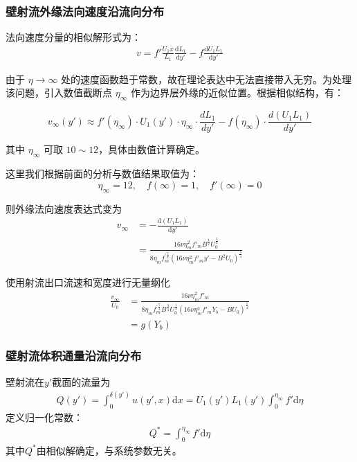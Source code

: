 \subsubsection{壁射流外缘法向速度沿流向分布}
法向速度分量的相似解形式为：
\begin{align*}
    v=f'\frac{U_{1}x}{L_{1}}\frac{\mathrm{d}L_{1}}{\mathrm{d}y'}-f\frac{\mathrm{d}U_{1}L_{1}}{\mathrm{d}y'}
\end{align*}

由于 $\eta \to \infty$ 处的速度函数趋于常数，故在理论表达中无法直接带入无穷。为处理该问题，引入数值截断点 $\eta_\infty$ 作为边界层外缘的近似位置。根据相似结构，有：

\[
v_{\infty}(y') \approx f'(\eta_\infty) \cdot U_1(y') \cdot \eta_\infty \cdot \frac{dL_1}{dy'} - f(\eta_\infty) \cdot \frac{d(U_1 L_1)}{dy'}
\]

其中 $\eta_\infty$ 可取 $10\sim12$，具体由数值计算确定。

这里我们根据前面的分析与数值结果取值为：
\[
\eta_{\infty}=12, \quad f(\infty)=1, \quad f'(\infty)=0
\]

则外缘法向速度表达式变为
\begin{align*}
    v_{\infty}&=-\frac{\mathrm{d}(U_{1}L_{1})}{\mathrm{d}y'}\\
    &=\frac{16\nu\eta_{m}^{2}f'_{m}B^{\frac{1}{2}}U_{0}^{\frac{3}{4}}}{8\eta_{m}f_{m}^{'\frac{7}{4}}(16\nu\eta_{m}^{2}f'_{m}y'-B^{2}U_{0})^{\frac{5}{4}}}
\end{align*}

使用射流出口流速和宽度进行无量纲化
\begin{align}
    \frac{v_{\infty}}{U_{0}}&=\frac{16\nu\eta_{m}^{2}f'_{m}}{8\eta_{m}f_{m}^{'\frac{7}{4}}B^{\frac{3}{4}}U_{0}^{\frac{1}{4}}(16\nu\eta_{m}^{2}f'_{m}Y_{b}-BU_{0})^{\frac{5}{4}}}\\
    & = g(Y_{b})
\end{align}

\subsubsection{壁射流体积通量沿流向分布}
壁射流在$y'$截面的流量为
\begin{align*}
    Q(y')=\int_{0}^{\delta(y')}u(y',x)\mathrm{d}x=U_{1}(y')L_{1}(y')\int_{0}^{\eta_{\infty}}f'\mathrm{d}\eta
\end{align*}
定义归一化常数：
\begin{align*}
    Q^{*}=\int_{0}^{\eta_{\infty}}f'\mathrm{d}\eta
\end{align*}
其中$Q^{*}$由相似解确定，与系统参数无关。

